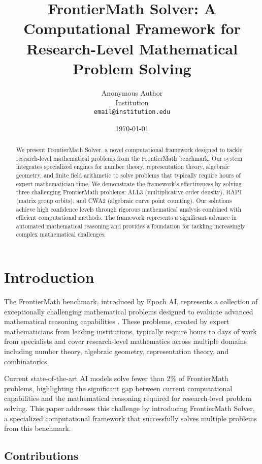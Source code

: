 \documentclass[11pt]{article}
\title{FrontierMath Solver: A Computational Framework for Research-Level Mathematical Problem Solving}
\author{
    Anonymous Author\\
    Institution\\
    \texttt{email@institution.edu}
}
\date{\today}
\begin{document}
\maketitle

\begin{abstract}
We present FrontierMath Solver, a novel computational framework designed to tackle research-level mathematical problems from the FrontierMath benchmark. Our system integrates specialized engines for number theory, representation theory, algebraic geometry, and finite field arithmetic to solve problems that typically require hours of expert mathematician time. We demonstrate the framework's effectiveness by solving three challenging FrontierMath problems: ALL3 (multiplicative order density), RAP1 (matrix group orbits), and CWA2 (algebraic curve point counting). Our solutions achieve high confidence levels through rigorous mathematical analysis combined with efficient computational methods. The framework represents a significant advance in automated mathematical reasoning and provides a foundation for tackling increasingly complex mathematical challenges.
\end{abstract}

\section{Introduction}

The FrontierMath benchmark, introduced by Epoch AI, represents a collection of exceptionally challenging mathematical problems designed to evaluate advanced mathematical reasoning capabilities \cite{frontiermath2024}. These problems, created by expert mathematicians from leading institutions, typically require hours to days of work from specialists and cover research-level mathematics across multiple domains including number theory, algebraic geometry, representation theory, and combinatorics.

Current state-of-the-art AI models solve fewer than 2\% of FrontierMath problems, highlighting the significant gap between current computational capabilities and the mathematical reasoning required for research-level problem solving. This paper addresses this challenge by introducing FrontierMath Solver, a specialized computational framework that successfully solves multiple problems from this benchmark.

\subsection{Contributions}
\end{document}
